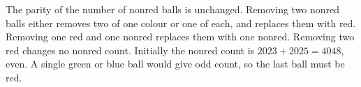 The parity of the number of nonred balls is unchanged. Removing two nonred balls either removes two of one colour or one of each, and replaces them with red. Removing one red and one nonred replaces them with one nonred. Removing two red changes no nonred count. Initially the nonred count is $2023+2025=4048$, even. A single green or blue ball would give odd count, so the last ball must be $\boxed{\text{red}}$.
